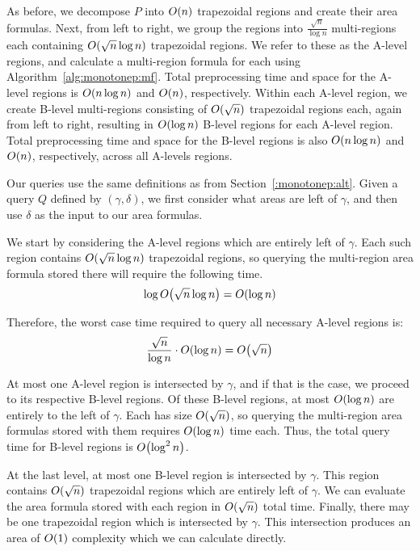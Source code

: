 As before, we decompose $P$ into $O\!\left(n\right)$ trapezoidal regions and create their area formulas.
Next, from left to right, we group the regions into $\frac{\sqrt{n}}{\log{n}}$ multi-regions each containing $O\!\left(\sqrt{n}\log{n}\right)$ trapezoidal regions.
We refer to these as the A-level regions, and calculate a multi-region formula for each using Algorithm~\ref{alg:monotonep:mf}.
Total preprocessing time and space for the A-level regions is $O\!\left(n\log{n}\right)$ and $O\!\left(n\right)$, respectively.
Within each A-level region, we create B-level multi-regions consisting of $O\!\left(\sqrt{n}\right)$ trapezoidal regions each, again from left to right, resulting in $O\!\left(\log{n}\right)$ B-level regions for each A-level region.
Total preprocessing time and space for the B-level regions is also $O\!\left(n\log{n}\right)$ and $O\!\left(n\right)$, respectively, across all A-levels regions.

Our queries use the same definitions as from Section~\ref{:monotonep:alt}. 
Given a query $Q$ defined by $(\gamma, \delta)$, we first consider what areas are left of $\gamma$, and then use $\delta$ as the input to our area formulas.

We start by considering the A-level regions which are entirely left of $\gamma$. 
Each such region contains $O\!\left(\sqrt{n}\log{n}\right)$ trapezoidal regions, so querying the multi-region area formula stored there will require the following time.
\[
\log{O\!\left(\sqrt{n}\log{n}\right)} = O\!\left(\log{n}\right)
\]

\noindent Therefore, the worst case time required to query all necessary A-level regions is:
\[
\frac{\sqrt{n}}{\log{n}} \cdot O\!\left(\log{n}\right) = O\!\left(\sqrt{n}\right)
\]

\noindent At most one A-level region is intersected by $\gamma$, and if that is the case, we proceed to its respective B-level regions.
Of these B-level regions, at most $O\!\left(\log{n}\right)$ are entirely to the left of $\gamma$.
Each has size $O\!\left(\sqrt{n}\right)$, so querying the multi-region area formulas stored with them requires $O\!\left(\log{n}\right)$ time each. Thus, the total query time for B-level regions is $O\!\left(\log^2{n}\right)$.

At the last level, at most one B-level region is intersected by $\gamma$. 
This region contains $O\!\left(\sqrt{n}\right)$ trapezoidal regions which are entirely left of $\gamma$.
We can evaluate the area formula stored with each region in $O\!\left(\sqrt{n}\right)$ total time.
Finally, there may be one trapezoidal region which is intersected by $\gamma$.
This intersection produces an area of $O\!\left(1\right)$ complexity which we can calculate directly.

